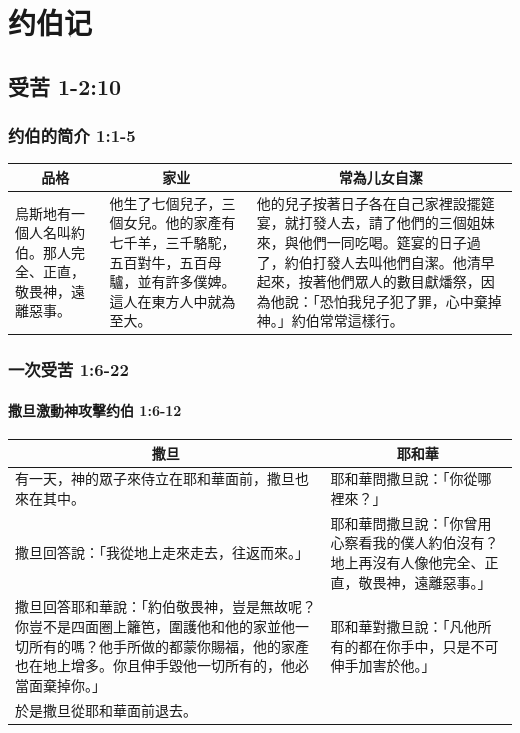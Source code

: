 
\chapter{约伯记}
\section{受苦 1-2:10}
\subsection{约伯的简介 1:1-5}
\begin{table}[H]
\hspace{-5mm}
\centering
\begin{tabular}{p{}|p{13.5em}|p{28em}}    \toprule
\multicolumn{1}{c|}{品格}&\multicolumn{1}{c|}{家业}&\multicolumn{1}{c}{常為儿女自潔}\\ \midrule
烏斯地有一個人名叫約伯。那人完全、正直，敬畏神，遠離惡事。
&他生了七個兒子，三個女兒。他的家產有七千羊，三千駱駝，五百對牛，五百母驢，並有許多僕婢。這人在東方人中就為至大。
&他的兒子按著日子各在自己家裡設擺筵宴，就打發人去，請了他們的三個姐妹來，與他們一同吃喝。筵宴的日子過了，約伯打發人去叫他們自潔。他清早起來，按著他們眾人的數目獻燔祭，因為他說：「恐怕我兒子犯了罪，心中棄掉神。」約伯常常這樣行。\\    \bottomrule
\end{tabular}
\end{table}


\subsection{一次受苦 1:6-22}
\subsubsection{撒旦激動神攻擊约伯 1:6-12}
\begin{table}[H]
\centering
\begin{tabular}{p{30.8em}|p{15.2em}}    \toprule
\multicolumn{1}{c|}{撒旦}&\multicolumn{1}{c}{耶和華}\\ \midrule
有一天，神的眾子來侍立在耶和華面前，撒旦也來在其中。 
&耶和華問撒旦說：「你從哪裡來？」\\ \midrule
撒旦回答說：「我從地上走來走去，往返而來。」&耶和華問撒旦說：「你曾用心察看我的僕人約伯沒有？地上再沒有人像他完全、正直，敬畏神，遠離惡事。」\\ \midrule
撒旦回答耶和華說：「約伯敬畏神，豈是無故呢？你豈不是四面圈上籬笆，圍護他和他的家並他一切所有的嗎？他手所做的都蒙你賜福，他的家產也在地上增多。你且伸手毀他一切所有的，他必當面棄掉你。」&耶和華對撒旦說：「凡他所有的都在你手中，只是不可伸手加害於他。」\\ \midrule
於是撒旦從耶和華面前退去。&\\    \bottomrule
\end{tabular}
\end{table}

